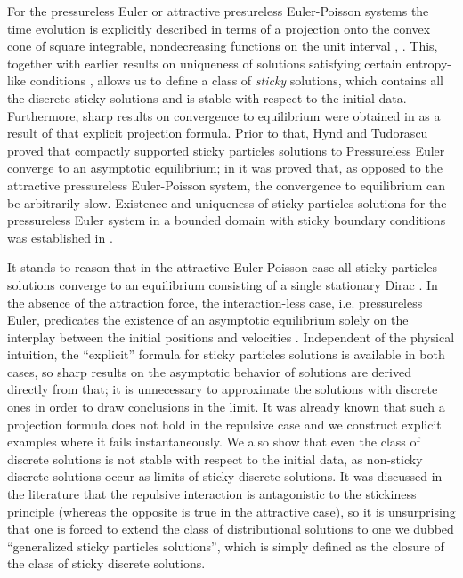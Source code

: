 \documentclass[11pt]{article}
\numberwithin{equation}{section}
\begin{document}
     For the pressureless Euler or attractive presureless Euler-Poisson systems the time evolution is explicitly described in terms of a projection onto the convex cone of square integrable, nondecreasing functions on the unit interval \cite{Natile-Savare}, \cite{BLPTW}. This, together with earlier results on uniqueness of solutions satisfying certain entropy-like conditions \cite{Huang-Wang}, allows us to define a class of {\it sticky} solutions, which contains all the discrete sticky solutions and is stable with respect to the initial data. Furthermore, sharp results on convergence to equilibrium were obtained in \cite{BLPTW} as a result of that explicit projection formula. Prior to that, Hynd and Tudorascu \cite{Hynd-Tudorascu} proved that compactly supported sticky particles solutions to Pressureless Euler converge to an asymptotic equilibrium; in \cite{Tudorascu-Wassink} it was proved that, as opposed to the attractive pressureless Euler-Poisson system, the convergence to equilibrium can be arbitrarily slow. Existence and uniqueness of sticky particles solutions for  the pressureless Euler system in a bounded domain with sticky boundary conditions was established in \cite{Tudorascu2023}.

     It stands to reason that in the attractive Euler-Poisson case all sticky particles solutions converge to an equilibrium consisting of a single stationary Dirac \cite{BLPTW}. In the absence of the attraction force, the interaction-less case, i.e. pressureless Euler, predicates the existence of an asymptotic equilibrium solely on the interplay between the initial positions and velocities \cite{Hynd-Tudorascu}. Independent of the physical intuition, the ``explicit'' formula for sticky particles solutions is available in both cases, so sharp results on the asymptotic behavior of solutions are derived directly from that; it is unnecessary to approximate the solutions with discrete ones in order to draw conclusions in the limit.
     It was already known that such a projection formula does not hold in the repulsive case \cite{Gangboetal} and we construct explicit examples where it fails instantaneously. We also show that even the class of discrete solutions is not stable with respect to the initial data, as non-sticky discrete solutions occur as limits of sticky discrete solutions. It was discussed in the literature \cite{Gangboetal} that the repulsive interaction is antagonistic to the stickiness principle (whereas the opposite is true in the attractive case), so it is unsurprising that one is forced to extend the class of distributional solutions to one we dubbed ``generalized sticky particles solutions'', which is simply defined as the closure of the class of sticky discrete solutions. 
\end{document}
